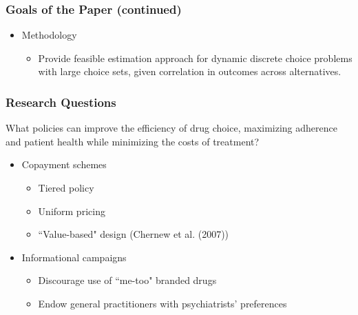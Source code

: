 
\begin{frame}
\frametitle{Goals of the Paper (continued)}

\begin{itemize}
\item Methodology

\begin{itemize}
\item Provide feasible estimation approach for dynamic discrete choice
problems with large choice sets, given correlation in outcomes across
alternatives.
\end{itemize}
\end{itemize}
\end{frame}




\begin{frame}
\frametitle{Research Questions}

What policies can improve the efficiency of drug choice, maximizing
adherence and patient health while minimizing the costs of treatment?

\begin{itemize}
\item Copayment schemes

\begin{itemize}
\item Tiered policy

\item Uniform pricing

\item ``Value-based" design (Chernew et al. (2007))
\end{itemize}

\item Informational campaigns

\begin{itemize}
\item Discourage use of ``me-too" branded drugs

\item Endow general practitioners with psychiatrists' preferences
\end{itemize}
\end{itemize}
\end{frame}


